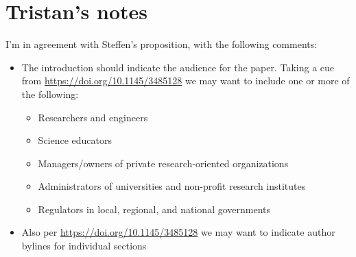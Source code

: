 \section*{Tristan's notes}

I'm in agreement with Steffen's proposition, with the following comments:

\begin{itemize}
\item The introduction should indicate the audience for the paper. Taking a cue from \url{https://doi.org/10.1145/3485128} we may want to include one or more of the following:
  \begin{itemize}
  \item Researchers and engineers
  \item Science educators
  \item Managers/owners of private research-oriented organizations
  \item Administrators of universities and non-profit research institutes
  \item Regulators in local, regional, and national governments
  \end{itemize}
\item Also per \url{https://doi.org/10.1145/3485128} we may want to indicate author bylines for individual sections
\end{itemize}

